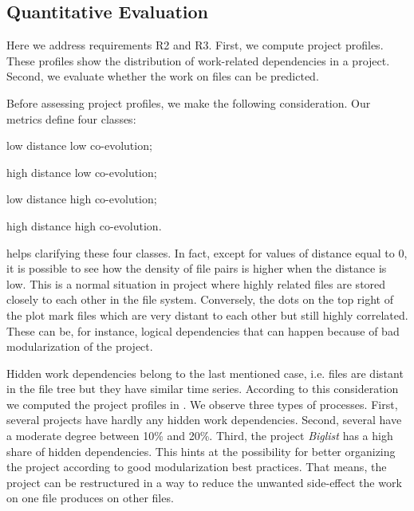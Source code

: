 \subsection{Quantitative Evaluation}
\label{subsec:quantitative-eval}

Here we address requirements R2 and R3. First, we compute project profiles. These profiles show the distribution of work-related dependencies in a project. Second, we evaluate whether the work on files can be predicted.

Before assessing project profiles, we make the following consideration. Our metrics define four classes:
\begin{inparaenum}[\itshape i)]
	\item low distance low co-evolution;
	\item high distance low co-evolution;
	\item low distance high co-evolution;
	\item high distance high co-evolution.
\end{inparaenum}  helps clarifying these four classes. In fact, except for values of distance equal to 0, it is possible to see how the density of file pairs is higher when the distance is low. This is a normal situation in project where highly related files are stored closely to each other in the file system. Conversely, the dots on the top right of the plot mark files which are very distant to each other but still highly correlated. These can be, for instance, logical dependencies that can happen because of bad modularization of the project.

Hidden work dependencies belong to the last mentioned case, i.e. files are distant in the file tree but they have similar time series. According to this consideration we computed the project profiles in . We observe three types of processes. First, several projects have hardly any hidden work dependencies. Second, several have a moderate degree between 10\% and 20\%. Third, the project \textit{Biglist} has a high share of hidden dependencies. This hints at the possibility for better organizing the project according to good modularization best practices. That means, the project can be restructured in a way to reduce the unwanted side-effect the work on one file produces on other files.
%



